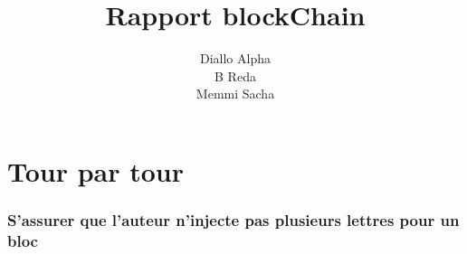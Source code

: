 \documentclass{article}
\begin{document}
\title{Rapport blockChain}
\author{Diallo Alpha\\B Reda\\Memmi Sacha}
\maketitle
\part{Tour par tour}
\section{S'assurer que l'auteur n'injecte pas plusieurs lettres pour un bloc}
\end{document}
